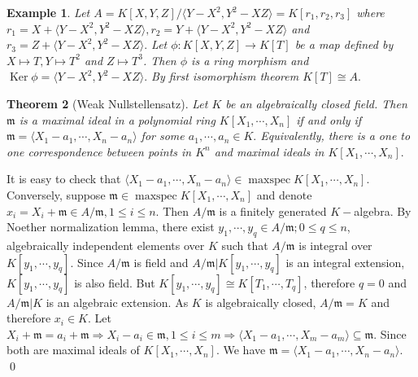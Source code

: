 \documentclass[11pt]{amsart}
\newtheorem{theorem}{Theorem}[section]
\newtheorem{eg}[theorem]{Example}
\newcommand{\gen}[1]{\langle#1\rangle}
\DeclareMathOperator{\Ker}{\text{Ker}}
\DeclareMathOperator{\mspec}{\text{maxspec}}
\begin{document}
\proof 

\begin{eg}

Let $A=K[X,Y,Z]/\gen{Y-X^2,Y^2-XZ}=K[r_1,r_2,r_3]$ where $r_1=X+\gen{Y-X^2,Y^2-XZ},r_2=Y+\gen{Y-X^2,Y^2-XZ}$ and $r_3=Z+\gen{Y-X^2,Y^2-XZ}.$ Let $\phi:K[X,Y,Z]\to K[T]$ be a map defined by $X\mapsto T,Y\mapsto T^2$ and $Z\mapsto T^3$. Then $\phi$ is a ring morphism and $\Ker \phi=\gen{Y-X^2,Y^2-XZ}.$ By first isomorphism theorem $K[T]\cong A.$

\begin{center}


\end{center}

\end{eg}

\begin{theorem}[Weak Nullstellensatz]

Let $K$ be an algebraically closed field. Then $\mathfrak{m}$ is a maximal ideal in a polynomial ring $K[X_1,\cdots,X_n]$ if and only if $\mathfrak{m}=\gen{X_1-a_1,\cdots,X_n-a_n}$ for some $a_1,\cdots,a_n\in K.$ Equivalently, there is a one to one correspondence between points in $K^n$ and maximal ideals in $K[X_1,\cdots,X_n].$

\end{theorem}

\proof It is easy to check that $\gen{X_1-a_1,\cdots,X_n-a_n}\in\mspec K[X_1,\cdots,X_n].$ Conversely, suppose $\mathfrak{m}\in\mspec K[X_1,\cdots,X_n]$ and denote $x_i=X_i+\mathfrak{m}\in A/\mathfrak{m},1\leq i\leq n.$ Then $A/\mathfrak{m}$ is a finitely generated $K-$algebra. By Noether normalization lemma, there exist $y_1,\cdots,y_q\in A/\mathfrak{m};0\leq q\leq n$, algebraically independent elements over $K$ such that $A/\mathfrak{m}$ is integral over $K[y_1,\cdots,y_q].$ Since $A/\mathfrak{m}$ is field and $A/\mathfrak{m}|K[y_1,\cdots,y_q]$ is an integral extension, $K[y_1,\cdots,y_q]$ is also field. But $K[y_1,\cdots,y_q]\cong K[T_1,\cdots,T_q]$, therefore $q=0$ and $A/\mathfrak{m}|K$ is an algebraic extension. As $K$ is algebraically closed, $A/\mathfrak{m}=K$ and therefore $x_i\in K.$ Let $X_i+\mathfrak{m}=a_i+\mathfrak{m} \Rightarrow X_i-a_i\in \mathfrak{m}, 1\leq i\leq m \Rightarrow \gen{X_1-a_1,\cdots,X_m-a_m}\subseteq \mathfrak{m}.$ Since both are maximal ideals of $K[X_1,\cdots,X_n]$. We have $\mathfrak{m}=\gen{X_1-a_1,\cdots,X_n-a_n}.$ \qed
\end{document}
